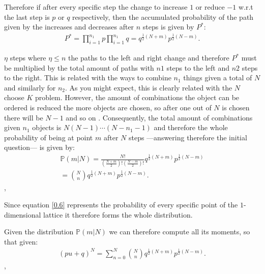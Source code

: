 \documentclass[12pt]{article}
\numberwithin{equation}{section}
\begin{document}
Therefore if after every specific step the change to increase $1$ or reduce $-1$ w.r.t the last step is $p$ or $q$ respectively, then the accumulated probability of the path given by the increases and decreases after $n$ steps is given by $P^*$:  
\begin{equation} \label{0.5}
    \begin{split}
         P^* = \prod_{i=1}^{n_1} p  \prod_{i=1}^{n_1} q = q^{\frac{1}{2}(N + m)} p^{\frac{1}{2}(N - m)}. 
    \end{split}
\end{equation}

$\eta$ steps where $\eta \leq n$ the paths to the left and right change and therefore $P^*$ must be multiplied by the total amount of paths with $n1$ steps to the left and $n2$ steps to the right. This is related with the ways to combine $n_1$ things given a total of $N$ and similarly for $n_2$. As you might expect, this is clearly related with the $N$ choose $K$ problem. However, the amount of combinations the object can be ordered is reduced the more objects are chosen, so after one out of $N$ is chosen there will be $N - 1$ and so on \cite{lawler2010random}.  Consequently, the total amount of combinations given $n_1$ objects is $N(N-1)\cdots(N-n_1-1)$ and therefore the whole probability of being at point $m$ after $N$ steps ---answering therefore the initial question--- is given by: 
\begin{equation} \label{0.6}
    \begin{split}
         \mathbb{P}(m | N) = \frac{N!}{\left(\frac{N + m}{2}\right)!\left(\frac{N - m}{2}\right)!} q^{\frac{1}{2}(N + m)} p^{\frac{1}{2}(N - m)} \\
         = \binom{N}{n} q^{\frac{1}{2}(N + m)} p^{\frac{1}{2}(N - m)}. 
    \end{split}
\end{equation},

Since equation \ref{0.6} represents the probability of every specific point of the $1$-dimensional lattice it therefore forms the whole distribution. 

Given the distribution $\mathbb{P}(m | N)$ we can therefore compute all its moments, so that given: 
\begin{equation} \label{0.7}
    \begin{split}
         (pu + q)^N = \sum^N_{n=0} \binom{N}{n} q^{\frac{1}{2}(N + m)} p^{\frac{1}{2}(N - m)}. 
    \end{split}
\end{equation},
\end{document}
